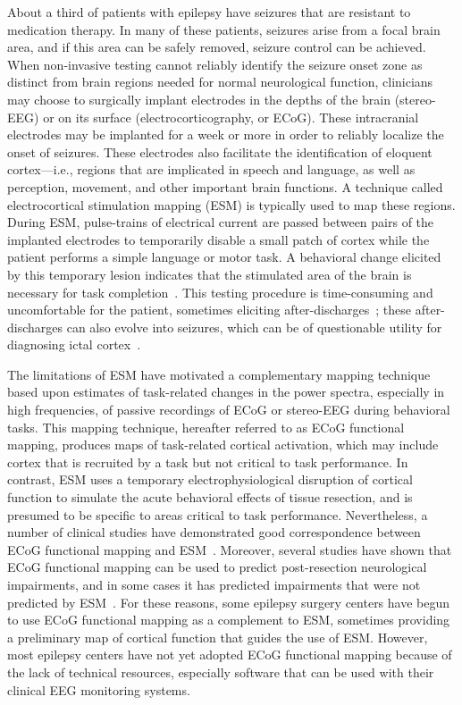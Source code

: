 \documentclass[utf8]{frontiersSCNS}
\begin{document}
About a third of patients with epilepsy have seizures that are resistant to medication therapy.
In many of these patients, seizures arise from a focal brain area, and if this area can be safely removed, seizure control can be achieved.
When non-invasive testing cannot reliably identify the seizure onset zone as distinct from brain regions needed for normal neurological function, clinicians may choose to surgically implant electrodes in the depths of the brain (stereo-EEG) or on its surface (electrocorticography, or ECoG).
These intracranial electrodes may be implanted for a week or more in order to reliably localize the onset of seizures.
These electrodes also facilitate the identification of eloquent cortex---i.e., regions that are implicated in speech and language, as well as perception, movement, and other important brain functions.
A technique called electrocortical stimulation mapping (ESM) is typically used to map these regions.
During ESM, pulse-trains of electrical current are passed between pairs of the implanted electrodes to temporarily disable a small patch of cortex while the patient performs a simple language or motor task.
A behavioral change elicited by this temporary lesion indicates that the stimulated area of the brain is necessary for task completion~\citep{ojemann_cortical_1989}.
This testing procedure is time-consuming and uncomfortable for the patient, sometimes eliciting after-discharges~\citep{lesser_cortical_1984}; these after-discharges can also evolve into seizures, which can be of questionable utility for diagnosing ictal cortex~\citep{hamberger_cortical_2007}.

The limitations of ESM have motivated a complementary mapping technique based upon estimates of task-related changes in the power spectra, especially in high frequencies, of passive recordings of ECoG or stereo-EEG during behavioral tasks.
This mapping technique, hereafter referred to as ECoG functional mapping, produces maps of task-related cortical activation, which may include cortex that is recruited by a task but not critical to task performance.
In contrast, ESM uses a temporary electrophysiological disruption of cortical function to simulate the acute behavioral effects of tissue resection, and is presumed to be specific to areas critical to task performance.
Nevertheless, a number of clinical studies have demonstrated good  correspondence between ECoG functional mapping and ESM~\citep{brunner_practical_2009, wang_spatial-temporal_2016}.
Moreover, several studies have shown that ECoG functional mapping can be used to predict post-resection neurological impairments, and in some cases it has predicted impairments that were not predicted by ESM~\citep{wang_spatial-temporal_2016}.
For these reasons, some epilepsy surgery centers have begun to use ECoG functional mapping as a complement to ESM, sometimes providing a preliminary map of cortical function that guides the use of ESM.
However, most epilepsy centers have not yet adopted ECoG functional mapping because of the lack of technical resources, especially software that can be used with their clinical EEG monitoring systems.
\end{document}
